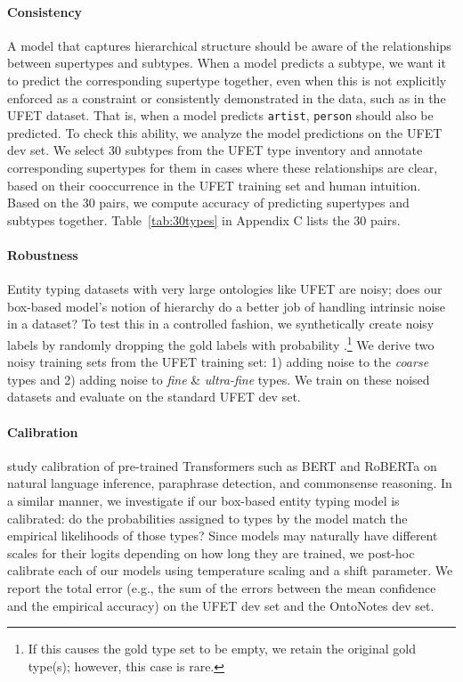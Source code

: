\documentclass[11pt,a4paper]{article}
\begin{document}
\paragraph{Consistency} A model that captures hierarchical structure should be aware of the relationships between supertypes and subtypes. When a model predicts a subtype, we want it to predict the corresponding supertype together, even when this is not explicitly enforced as a constraint or consistently demonstrated in the data, such as in the UFET dataset. That is, when a model predicts {\tt artist}, {\tt person} should also be predicted. To check this ability, we analyze the model predictions on the UFET dev set. We select 30 subtypes from the UFET type inventory and annotate corresponding supertypes for them in cases where these relationships are clear, based on their cooccurrence in the UFET training set and human intuition. Based on the 30 pairs, we compute accuracy of predicting supertypes and subtypes together. Table~\ref{tab:30types} in Appendix C lists the 30 pairs.  

\paragraph{Robustness} Entity typing datasets with very large ontologies like UFET are noisy; does our box-based model's notion of hierarchy do a better job of handling intrinsic noise in a dataset? To test this in a controlled fashion, we synthetically create noisy labels by randomly dropping the gold labels with probability .\footnote{If this causes the gold type set to be empty, we retain the original gold type(s); however, this case is rare.} We derive two noisy training sets from the UFET training set: 1) adding noise to the \emph{coarse} types and 2) adding noise to \emph{fine} \& \emph{ultra-fine} types. We train on these noised datasets and evaluate on the standard UFET dev set.



\paragraph{Calibration} \citet{Shrey_Desai_20} study calibration of pre-trained Transformers such as BERT and RoBERTa \citep{Yinhan_Liu_19} on natural language inference, paraphrase detection, and commonsense reasoning. In a similar manner, we investigate if our box-based entity typing model is calibrated: do the probabilities assigned to types by the model match the empirical likelihoods of those types? Since models may naturally have different scales for their logits depending on how long they are trained, we post-hoc calibrate each of our models using temperature scaling \cite{Chuan_Guo_17} and a shift parameter.  We report the total error (e.g., the sum of the errors between the mean confidence and the empirical accuracy) on the UFET dev set and the OntoNotes dev set.
\end{document}
